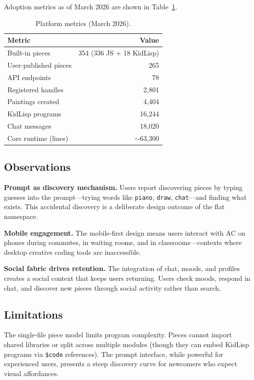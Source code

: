 \documentclass[10pt,letterpaper,twocolumn]{article}
\begin{document}
Adoption metrics as of March 2026 are shown in Table~\ref{tab:adoption}.

\begin{table}[h]
\small
\centering
\begin{tabular}{lr}
\toprule
\textbf{Metric} & \textbf{Value} \\
\midrule
Built-in pieces & 354 (336 JS + 18 KidLisp) \\
User-published pieces & 265 \\
API endpoints & 78 \\
Registered handles & 2,801 \\
Paintings created & 4,404 \\
KidLisp programs & 16,244 \\
Chat messages & 18,020 \\
Core runtime (lines) & $\sim$63,300 \\
\bottomrule
\end{tabular}
\caption{Platform metrics (March 2026).}
\label{tab:adoption}
\end{table}

\subsection{Observations}

\textbf{Prompt as discovery mechanism.} Users report discovering pieces by typing guesses into the prompt---trying words like \texttt{piano}, \texttt{draw}, \texttt{chat}---and finding what exists. This accidental discovery is a deliberate design outcome of the flat namespace.

\textbf{Mobile engagement.} The mobile-first design means users interact with AC on phones during commutes, in waiting rooms, and in classrooms---contexts where desktop creative coding tools are inaccessible.

\textbf{Social fabric drives retention.} The integration of chat, moods, and profiles creates a social context that keeps users returning. Users check moods, respond in chat, and discover new pieces through social activity rather than search.

\subsection{Limitations}

The single-file piece model limits program complexity. Pieces cannot import shared libraries or split across multiple modules (though they can embed KidLisp programs via \texttt{\$code} references). The prompt interface, while powerful for experienced users, presents a steep discovery curve for newcomers who expect visual affordances.
\end{document}
